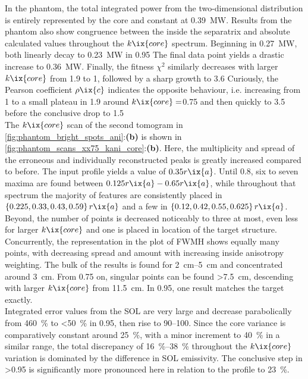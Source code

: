                 In the phantom, the total integrated power from the two-dimensional distribution is entirely represented by the core and constant at \SI{0.39}{\mega\watt}. Results from the phantom also show congruence between the inside the separatrix and absolute calculated values throughout the $k\ix{core}$ spectrum. Beginning in \SI{0.27}{\mega\watt}, both linearly decay to \SI{0.23}{\mega\watt} in \SI{0.95}{\arbitraryunit} The final data point yields a drastic increase to \SI{0.36}{\mega\watt}. Finally, the fitness $\chi^{2}$ similarly decreases with larger $k\ix{core}$ from \SI{1.9}{\arbitraryunit} to \SI{1}{\arbitraryunit}, followed by a sharp growth to \SI{3.6}{\arbitraryunit} Curiously, the Pearson coefficient $\rho\ix{c}$ indicates the opposite behaviour, i.e. increasing from \SI{1}{\arbitraryunit} to a small plateau in \SI{1.9}{\arbitraryunit} around $k\ix{core}=$\SI{0.75}{\arbitraryunit} and then quickly to \SI{3.5}{\arbitraryunit} before the conclusive drop to \SI{1.5}{\arbitraryunit}\\%
                The $k\ix{core}$ scan of the second tomogram in \cref{fig:phantom_bright_spots_ani}:\textbf{(b)} is shown in \cref{fig:phantom_scans_xx75_kani_core}:\textbf{(b)}. Here, the multiplicity and spread of the erroneous and individually reconstructed peaks is greatly increased compared to before. The input profile yields a value of $0.35r\ix{a}$. Until \SI{0.8}{\arbitraryunit}, six to seven maxima are found between $0.125r\ix{a}-0.65r\ix{a}$, while throughout that spectrum the majority of features are consistently placed in $\left\{0.225, 0.33, 0.43, 0.59\right\}r\ix{a}$ and a few in $\left\{0.12, 0.42, 0.55, 0.625\right\}r\ix{a}$. Beyond, the number of points is decreased noticeably to three at most, even less for larger $k\ix{core}$ and one is placed in location of the target structure. Concurrently, the representation in the plot of FWMH shows equally many points, with decreasing spread and amount with increasing inside anisotropy weighting. The bulk of the results is found for \SIrange{2}{5}{\centi\meter} and concentrated around \SI{3}{\centi\meter}. From \SI{0.75}{\arbitraryunit} on, singular points can be found >\SI{7.5}{\centi\meter}, descending with larger $k\ix{core}$ from \SI{11.5}{\centi\meter}. In \SI{0.95}{\arbitraryunit}, one result matches the target exactly.\\%
                Integrated error values from the SOL are very large and decrease parabolically from \SI{460}{\percent} to <\SI{50}{\percent} in \SI{0.95}{\arbitraryunit}, then rise to \SIrange{90}{100}{\arbitraryunit}. Since the core variance is comparatively constant around \SI{25}{\percent}, with a minor increment to \SI{40}{\percent} in a similar range, the total discrepancy of \SIrange{16}{38}{\percent} throughout the $k\ix{core}$ variation is dominated by the difference in SOL emissivity. The conclusive step in >\SI{0.95}{\arbitraryunit} is significantly more pronounced here in relation to the profile to \SI{23}{\percent}.\\%
